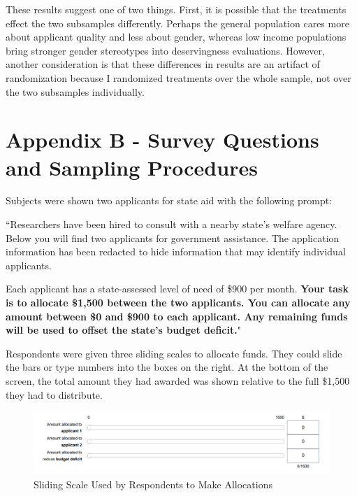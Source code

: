 \documentclass[12pt]{article}%
\begin{document}
\begin{doublespace}
These results suggest one of two things. First, it is possible that the treatments effect the two subsamples differently. Perhaps the general population cares more about applicant quality and less about gender, whereas low income populations bring stronger gender stereotypes into deservingness evaluations. However, another consideration is that these differences in results are an artifact of randomization because I randomized treatments over the whole sample, not over the two subsamples individually.


\section*{Appendix B - Survey Questions and Sampling Procedures}
Subjects were shown two applicants for state aid with the following prompt:

``Researchers have been hired to consult with a nearby state’s welfare agency. Below you will find two applicants for government assistance. The application information has been redacted to hide information that may identify individual applicants.

Each applicant has a state-assessed level of need of \$900 per month. \textbf{Your task is to allocate \$1,500 between the two applicants. You can allocate any amount between \$0 and \$900 to each applicant. Any remaining funds will be used to offset the state’s budget deficit.}"

Respondents were given three sliding scales to allocate funds. They could slide the bars or type numbers into the boxes on the right. At the bottom of the screen, the total amount they had awarded was shown relative to the full \$1,500 they had to distribute.

\begin{figure}[h!]
	\centering
	\includegraphics[scale=.75]{figs/sliding-scale.png}
	\caption{Sliding Scale Used by Respondents to Make Allocations}
	\label{}
\end{figure}





\end{doublespace}

\pagebreak


\end{document}
